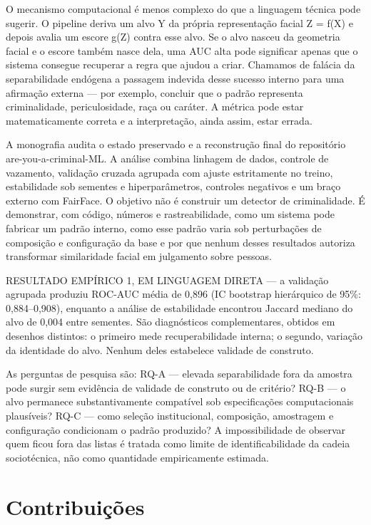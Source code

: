 O mecanismo computacional é menos complexo do que a linguagem técnica pode sugerir. O pipeline deriva um alvo Y da própria representação facial Z = f(X) e depois avalia um escore g(Z) contra esse alvo. Se o alvo nasceu da geometria facial e o escore também nasce dela, uma AUC alta pode significar apenas que o sistema consegue recuperar a regra que ajudou a criar. Chamamos de falácia da separabilidade endógena a passagem indevida desse sucesso interno para uma afirmação externa --- por exemplo, concluir que o padrão representa criminalidade, periculosidade, raça ou caráter. A métrica pode estar matematicamente correta e a interpretação, ainda assim, estar errada.

A monografia audita o estado preservado e a reconstrução final do repositório are-you-a-criminal-ML. A análise combina linhagem de dados, controle de vazamento, validação cruzada agrupada com ajuste estritamente no treino, estabilidade sob sementes e hiperparâmetros, controles negativos e um braço externo com FairFace. O objetivo não é construir um detector de criminalidade. É demonstrar, com código, números e rastreabilidade, como um sistema pode fabricar um padrão interno, como esse padrão varia sob perturbações de composição e configuração da base e por que nenhum desses resultados autoriza transformar similaridade facial em julgamento sobre pessoas.

\begin{boxtext}RESULTADO EMPÍRICO 1, EM LINGUAGEM DIRETA --- a validação agrupada produziu ROC-AUC média de 0,896 (IC bootstrap hierárquico de 95\%: 0,884--0,908), enquanto a análise de estabilidade encontrou Jaccard mediano do alvo de 0,004 entre sementes. São diagnósticos complementares, obtidos em desenhos distintos: o primeiro mede recuperabilidade interna; o segundo, variação da identidade do alvo. Nenhum deles estabelece validade de construto.\end{boxtext}

As perguntas de pesquisa são: RQ-A --- elevada separabilidade fora da amostra pode surgir sem evidência de validade de construto ou de critério? RQ-B --- o alvo permanece substantivamente compatível sob especificações computacionais plausíveis? RQ-C --- como seleção institucional, composição, amostragem e configuração condicionam o padrão produzido? A impossibilidade de observar quem ficou fora das listas é tratada como limite de identificabilidade da cadeia sociotécnica, não como quantidade empiricamente estimada.

\section{Contribuições}

